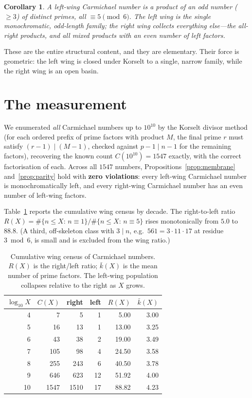 \documentclass[11pt]{article}
\theoremstyle{plain}
\newtheorem{corollary}{Corollary}
\theoremstyle{definition}
\begin{document}
\begin{corollary}\label{cor:left}
A left-wing Carmichael number is a product of an \emph{odd} number ($\ge3$) of distinct primes, all
$\equiv5\pmod6$. The left wing is the single monochromatic, odd-length family; the right wing
collects everything else---the all-right products, and all mixed products with an even number of left
factors.
\end{corollary}

These are the entire structural content, and they are elementary. Their force is geometric: the left
wing is closed under Korselt to a single, narrow family, while the right wing is an open basin.

\section{The measurement}
We enumerated \emph{all} Carmichael numbers up to $10^{10}$ by the Korselt divisor method (for each
ordered prefix of prime factors with product $M$, the final prime $r$ must satisfy $(r-1)\mid(M-1)$,
checked against $p-1\mid n-1$ for the remaining factors), recovering the known count $C(10^{10})=1547$
\cite{Pinch} exactly, with the correct factorisation of each. Across all $1547$ numbers,
Propositions~\ref{prop:membrane} and~\ref{prop:parity} hold with \textbf{zero violations}: every
left-wing Carmichael number is monochromatically left, and every right-wing Carmichael number has an
even number of left-wing factors.

Table~\ref{tab:Rx} reports the cumulative wing census by decade. The right-to-left ratio
$R(X)=\#\{n\le X:\,n\equiv1\}/\#\{n\le X:\,n\equiv5\}$ rises monotonically from $5.0$ to $88.8$.
(A third, off-skeleton class with $3\mid n$, e.g.\ $561=3\cdot11\cdot17$ at residue $3\bmod6$, is small
and is excluded from the wing ratio.)

\begin{table}[h]
\centering
\begin{tabular}{rrrrrr}
\toprule
$\log_{10}X$ & $C(X)$ & right & left & $R(X)$ & $\bar k(X)$\\
\midrule
4  & 7    & 5    & 1  & 5.00  & 3.00\\
5  & 16   & 13   & 1  & 13.00 & 3.25\\
6  & 43   & 38   & 2  & 19.00 & 3.49\\
7  & 105  & 98   & 4  & 24.50 & 3.58\\
8  & 255  & 243  & 6  & 40.50 & 3.78\\
9  & 646  & 623  & 12 & 51.92 & 4.00\\
10 & 1547 & 1510 & 17 & 88.82 & 4.23\\
\bottomrule
\end{tabular}
\caption{Cumulative wing census of Carmichael numbers. $R(X)$ is the right/left ratio; $\bar k(X)$ is
the mean number of prime factors. The left-wing population collapses relative to the right as $X$
grows.}
\label{tab:Rx}
\end{table}
\end{document}
